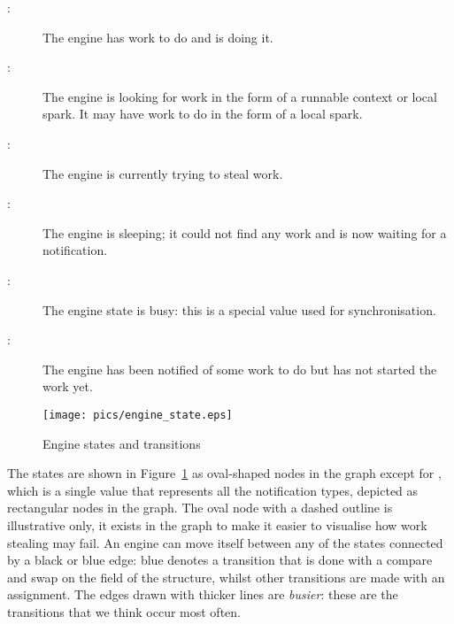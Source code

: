 \begin{description}
    \item[:] The engine has work to do and is doing it.

    \item[:] The engine is looking for work in
        the form of a runnable context or local spark.  It may have work to
        do in the form of a local spark.

    \item[:] The engine is currently trying to steal work.

    \item[:] The engine is sleeping; it could not find any
        work and is now waiting for a notification.

    \item[:] The engine state is busy: this is a special value
        used for synchronisation.

    \item[:] The engine has been notified of some work to
        do but has not started the work yet.
\end{description}

\begin{figure}
\begin{center}
\texttt{[image: pics/engine\_state.eps]}
\end{center}
\caption{Engine states and transitions}
\label{fig:engine_states}
\end{figure}

\noindent
The states are shown in Figure~\ref{fig:engine_states} as oval-shaped nodes
in the graph except for ,
which is a single value that represents all the notification types,
depicted as rectangular nodes in the graph.
The oval node with a dashed outline is illustrative only,
it exists in the graph to make it easier to visualise how work stealing may
fail.
An engine can move itself between any of the states connected by a black or
blue edge:
blue denotes a transition that is done with a compare and swap on the
 field of the \enginesleepsync structure,
whilst other transitions are made with an assignment.
The edges drawn with thicker lines are \emph{busier}:
these are the transitions that we think occur most often.

